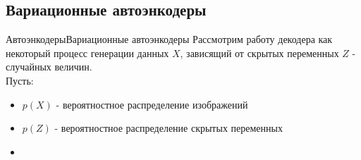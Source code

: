 \documentclass{beamer}
\begin{document}
\subsection{Вариационные автоэнкодеры}

\begin{frame}{Автоэнкодеры}{Вариационные автоэнкодеры}
Рассмотрим работу декодера как некоторый процесс генерации данных $X$, зависящий от скрытых переменных $Z$ - случайных величин.\\
Пусть:
\begin{itemize}
	\item $p(X)$ - вероятностное распределение изображений
	\item $p(Z)$ - вероятностное распределение скрытых переменных
	\item $$
\end{itemize}
\end{frame}
\end{document}
